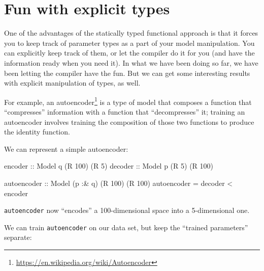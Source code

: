 \documentclass[]{article}
\newenvironment{Shaded}{}{}
\newcommand{\DataTypeTok}[1]{\textcolor[rgb]{0.56,0.13,0.00}{#1}}
\newcommand{\DecValTok}[1]{\textcolor[rgb]{0.25,0.63,0.44}{#1}}
\newcommand{\FunctionTok}[1]{\textcolor[rgb]{0.02,0.16,0.49}{#1}}
\newcommand{\NormalTok}[1]{#1}
\newcommand{\OtherTok}[1]{\textcolor[rgb]{0.00,0.44,0.13}{#1}}
\renewcommand{\href}[2]{#2\footnote{\url{#1}}}
\begin{document}
\hypertarget{fun-with-explicit-types}{%
\section{Fun with explicit types}\label{fun-with-explicit-types}}

One of the advantages of the statically typed functional approach is that it
forces you to keep track of parameter types as a part of your model
manipulation. You can explicitly keep track of them, or let the compiler do it
for you (and have the information ready when you need it). In what we have been
doing so far, we have been letting the compiler have the fun. But we can get
some interesting results with explicit manipulation of types, as well.

For example, an \href{https://en.wikipedia.org/wiki/Autoencoder}{autoencoder} is
a type of model that composes a function that ``compresses'' information with a
function that ``decompresses'' it; training an autoencoder involves training the
composition of those two functions to produce the identity function.

We can represent a simple autoencoder:

\begin{Shaded}
\begin{Highlighting}[]
\OtherTok{encoder ::} \DataTypeTok{Model}\NormalTok{ q (}\DataTypeTok{R} \DecValTok{100}\NormalTok{) (}\DataTypeTok{R} \DecValTok{5}\NormalTok{)}
\OtherTok{decoder ::} \DataTypeTok{Model}\NormalTok{ p (}\DataTypeTok{R} \DecValTok{5}\NormalTok{)   (}\DataTypeTok{R} \DecValTok{100}\NormalTok{)}

\OtherTok{autoencoder ::} \DataTypeTok{Model}\NormalTok{ (p }\FunctionTok{:&}\NormalTok{ q) (}\DataTypeTok{R} \DecValTok{100}\NormalTok{) (}\DataTypeTok{R} \DecValTok{100}\NormalTok{)}
\NormalTok{autoencoder }\FunctionTok{=}\NormalTok{ decoder }\FunctionTok{<~}\NormalTok{ encoder}
\end{Highlighting}
\end{Shaded}

\texttt{autoencoder} now ``encodes'' a 100-dimensional space into a
5-dimensional one.

We can train \texttt{autoencoder} on our data set, but keep the ``trained
parameters'' separate:

\begin{Shaded}
\end{Shaded}
\end{document}
